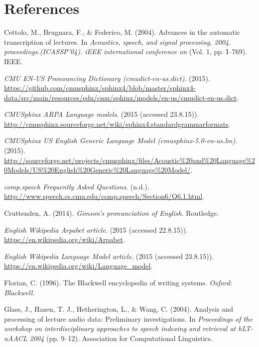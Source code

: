 \documentclass[]{article}
\begin{document}
\section*{References}\label{references}

Cettolo, M., Brugnara, F., \& Federico, M. (2004). Advances in the
automatic transcription of lectures. In \emph{Acoustics, speech, and
signal processing, 2004. proceedings.(ICASSP'04). iEEE international
conference on} (Vol. 1, pp. I--769). IEEE.

\emph{CMU EN-US Pronouncing Dictionary (cmudict-en-us.dict)}. (2015).
\url{https://github.com/cmusphinx/sphinx4/blob/master/sphinx4-data/src/main/resources/edu/cmu/sphinx/models/en-us/cmudict-en-us.dict}.

\emph{CMUSphinx ARPA Language models}. (2015 (accessed 23.8.15)).
\url{http://cmusphinx.sourceforge.net/wiki/sphinx4:standardgrammarformats}.

\emph{CMUSphinx US English Generic Language Model
(cmusphinx-5.0-en-us.lm)}. (2015).
\url{http://sourceforge.net/projects/cmusphinx/files/Acoustic\%20and\%20Language\%20Models/US\%20English\%20Generic\%20Language\%20Model/}.

\emph{comp.speech Frequently Asked Questions}. (n.d.).
\url{http://www.speech.cs.cmu.edu/comp.speech/Section6/Q6.1.html}.

Cruttenden, A. (2014). \emph{Gimson's pronunciation of English}.
Routledge.

\emph{English Wikipedia Arpabet article}. (2015 (accessed 22.8.15)).
\url{https://en.wikipedia.org/wiki/Arpabet}.

\emph{English Wikipedia Language Model article}. (2015 (accessed
23.8.15)). \url{https://en.wikipedia.org/wiki/Language_model}.

Florian, C. (1996). The Blackwell encyclopedia of writing systems.
\emph{Oxford: Blackwell}.

Glass, J., Hazen, T. J., Hetherington, L., \& Wang, C. (2004). Analysis
and processing of lecture audio data: Preliminary investigations. In
\emph{Proceedings of the workshop on interdisciplinary approaches to
speech indexing and retrieval at hLT-nAACL 2004} (pp. 9--12).
Association for Computational Linguistics.
\end{document}
